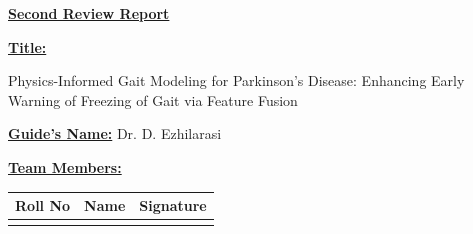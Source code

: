 \documentclass[12pt,a4paper]{article}
\begin{document}
\thispagestyle{fancy}
\vspace*{1.5cm}

\begin{center}
  {\LARGE\textbf{\underline{Second Review Report}}}

  \vspace{1.2cm}
  \begin{minipage}{0.85\textwidth}
    \begin{flushleft}
      {\large\textbf{\underline{Title:}}}\\[6pt]
      \hspace{1em}\parbox{0.9\linewidth}{Physics-Informed Gait Modeling for Parkinson's Disease:
        Enhancing Early Warning of Freezing of Gait via Feature Fusion}
    \end{flushleft}
  \end{minipage}

  \vspace{1.0cm}
  \begin{minipage}{0.85\textwidth}
    \begin{flushleft}
      {\large\textbf{\underline{Guide's Name:}} Dr. D. Ezhilarasi}\\[6pt]
      \hspace{1em}%
    \end{flushleft}
  \end{minipage}

  \vspace{1.0cm}
  \begin{minipage}{0.85\textwidth}
    \begin{flushleft}
      {\large\textbf{\underline{Team Members:}}}
    \end{flushleft}
  \end{minipage}

  \vspace{0.5cm}
  \begin{tabular}{|p{3.8cm}|p{5cm}|p{5cm}|}
    \hline
    \textbf{Roll No} & \textbf{Name} & \textbf{Signature} \\
    \hline
    & & \\[2.2cm]
    \hline
  \end{tabular}
\end{center}

\newpage
\end{document}

